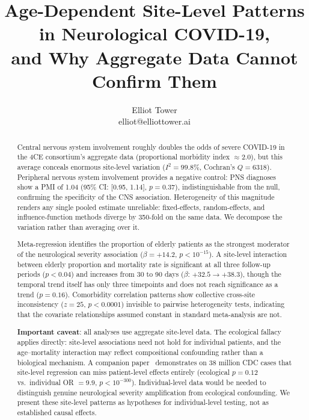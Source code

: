 \documentclass{article}
\title{Age-Dependent Site-Level Patterns in Neurological COVID-19,\\and Why Aggregate Data Cannot Confirm Them}
\author{\name Elliot Tower \\
      \email elliot@elliottower.ai}
\begin{document}
\maketitle

\begin{abstract}
Central nervous system involvement roughly doubles the odds of severe COVID-19 in the 4CE consortium's aggregate data (proportional morbidity index $\approx 2.0$), but this average conceals enormous site-level variation ($I^2 = 99.8\%$, Cochran's $Q = 6318$).
Peripheral nervous system involvement provides a negative control: PNS diagnoses show a PMI of 1.04 (95\% CI: [0.95, 1.14], $p = 0.37$), indistinguishable from the null, confirming the specificity of the CNS association.
Heterogeneity of this magnitude renders any single pooled estimate unreliable: fixed-effects, random-effects, and influence-function methods diverge by 350-fold on the same data.
We decompose the variation rather than averaging over it.

Meta-regression identifies the proportion of elderly patients as the strongest moderator of the neurological severity association ($\beta = +14.2$, $p < 10^{-15}$).
A site-level interaction between elderly proportion and mortality rate is significant at all three follow-up periods ($p < 0.04$) and increases from 30 to 90 days ($\beta$: $+32.5 \to +38.3$), though the temporal trend itself has only three timepoints and does not reach significance as a trend ($p = 0.16$).
Comorbidity correlation patterns show collective cross-site inconsistency ($z = 25$, $p < 0.0001$) invisible to pairwise heterogeneity tests, indicating that the covariate relationships assumed constant in standard meta-analysis are not.

\textbf{Important caveat}: all analyses use aggregate site-level data.
The ecological fallacy applies directly: site-level associations need not hold for individual patients, and the age--mortality interaction may reflect compositional confounding rather than a biological mechanism.
A companion paper~\cite{tower2026averages} demonstrates on 38 million CDC cases that site-level regression can miss patient-level effects entirely (ecological $p = 0.12$ vs.\ individual OR $= 9.9$, $p < 10^{-300}$).
Individual-level data would be needed to distinguish genuine neurological severity amplification from ecological confounding.
We present these site-level patterns as hypotheses for individual-level testing, not as established causal effects.
\end{abstract}
\end{document}

